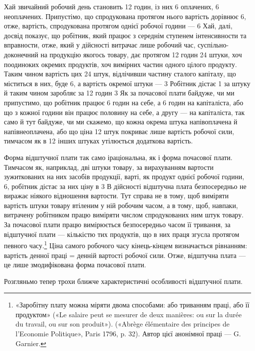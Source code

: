 Хай звичайний робочий день становить 12 годин, із них 6
оплачених, 6 неоплачених. Припустімо, що спродукована протягом
нього вартість дорівнює 6, отже, вартість, спродукована
протягом однієї робочої години — 6 Хай,
далі, досвід показує, що робітник, який працює з середнім
ступенем інтенсивности та вправности, отже, який у дійсності
витрачає лише робочий час, суспільно-доконечний на продукцію
якогось товару, дає протягом 12 годин 24 штуки, хоч поодиноких
окремих продуктів, хоч вимірних частин одного цілого продукту.
Таким чином вартість цих 24 штук, відлічивши частину
сталого капіталу, що міститься в них, буде 6, а вартість
окремої штуки — 3 Робітник дістає 1 за
штуку й таким чином заробляє за 12 годин 3 Як за
почасової плати байдуже, чи ми припустимо, що робітник працює
6 годин на себе, а 6 годин на капіталіста, або що з кожної години
він працює половину на себе, а другу — на капіталіста, так само
й тут байдуже, чи ми скажемо, що кожна окрема штука напівоплачена
й напівнеоплачена, або що ціна 12 штук покриває лише
вартість робочої сили, тимчасом як в 12 інших штуках утілюється
додаткова вартість.

Форма відштучної плати так само іраціональна, як і форма
почасової плати. Тимчасом як, наприклад, дві штуки товару,
за вирахуванням вартости зужиткованих на них засобів продукції,
варті, як продукт однієї робочої години, 6, робітник дістає
за них ціну в 3 В дійсності відштучна плата безпосередньо
не виражає ніякого відношення вартости. Тут справа не в тому,
щоб виміряти вартість штуки товару втіленим у ній робочим
часом, а в тому, щоб, навпаки, витрачену робітником працю виміряти
числом спродукованих ним штук товару. За почасової
плати працю вимірюється безпосередньо часом її тривання, за
відштучної плати — кількістю тих продуктів, що в них праця
згусла протягом певного часу.\footnote{
«Заробітну плату можна міряти двома способами: або триванням
праці, або її продуктом» («Le salaire peut se mesurer de deux manières:
ou sur la durée du travail, ou sur son produit»). («Abrège élémentaire des
principes de l’Economie Politique», Paris 1796, p. 32). Автор цієї анонімної
праці — G. Garnier.
} Ціна самого робочого часу кінець-кінцем
визначається рівнанням: вартість денної праці =
денній вартості робочої сили. Отже, відштучна плата — це лише
змодифікована форма почасової плати.

Розгляньмо тепер трохи ближче характеристичні особливості
відштучної плати.

